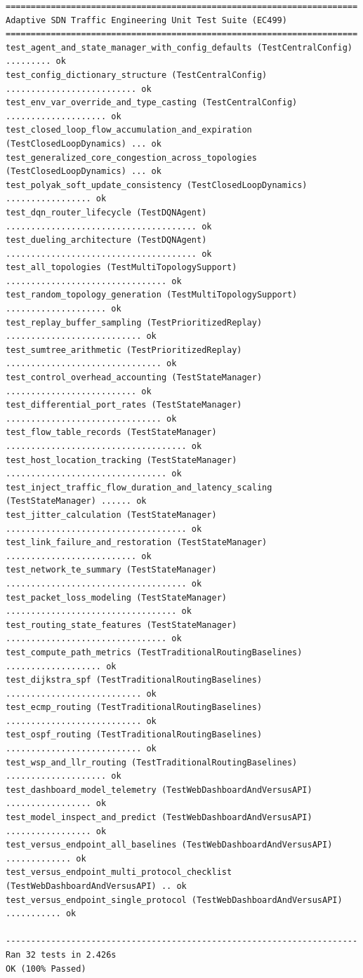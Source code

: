 \documentclass[12pt,a4paper,oneside]{report}
\begin{document}
\begin{lstlisting}[basicstyle=\ttfamily\scriptsize, caption={Full Execution Log of the Automated Test Suite (test\_suite.py)}]
======================================================================
Adaptive SDN Traffic Engineering Unit Test Suite (EC499)
======================================================================
test_agent_and_state_manager_with_config_defaults (TestCentralConfig) ......... ok
test_config_dictionary_structure (TestCentralConfig) .......................... ok
test_env_var_override_and_type_casting (TestCentralConfig) .................... ok
test_closed_loop_flow_accumulation_and_expiration (TestClosedLoopDynamics) ... ok
test_generalized_core_congestion_across_topologies (TestClosedLoopDynamics) ... ok
test_polyak_soft_update_consistency (TestClosedLoopDynamics) ................. ok
test_dqn_router_lifecycle (TestDQNAgent) ...................................... ok
test_dueling_architecture (TestDQNAgent) ...................................... ok
test_all_topologies (TestMultiTopologySupport) ................................ ok
test_random_topology_generation (TestMultiTopologySupport) .................... ok
test_replay_buffer_sampling (TestPrioritizedReplay) ........................... ok
test_sumtree_arithmetic (TestPrioritizedReplay) ............................... ok
test_control_overhead_accounting (TestStateManager) .......................... ok
test_differential_port_rates (TestStateManager) ............................... ok
test_flow_table_records (TestStateManager) .................................... ok
test_host_location_tracking (TestStateManager) ................................ ok
test_inject_traffic_flow_duration_and_latency_scaling (TestStateManager) ...... ok
test_jitter_calculation (TestStateManager) .................................... ok
test_link_failure_and_restoration (TestStateManager) .......................... ok
test_network_te_summary (TestStateManager) .................................... ok
test_packet_loss_modeling (TestStateManager) .................................. ok
test_routing_state_features (TestStateManager) ................................ ok
test_compute_path_metrics (TestTraditionalRoutingBaselines) ................... ok
test_dijkstra_spf (TestTraditionalRoutingBaselines) ........................... ok
test_ecmp_routing (TestTraditionalRoutingBaselines) ........................... ok
test_ospf_routing (TestTraditionalRoutingBaselines) ........................... ok
test_wsp_and_llr_routing (TestTraditionalRoutingBaselines) .................... ok
test_dashboard_model_telemetry (TestWebDashboardAndVersusAPI) ................. ok
test_model_inspect_and_predict (TestWebDashboardAndVersusAPI) ................. ok
test_versus_endpoint_all_baselines (TestWebDashboardAndVersusAPI) ............. ok
test_versus_endpoint_multi_protocol_checklist (TestWebDashboardAndVersusAPI) .. ok
test_versus_endpoint_single_protocol (TestWebDashboardAndVersusAPI) ........... ok

----------------------------------------------------------------------
Ran 32 tests in 2.426s
OK (100% Passed)
\end{lstlisting}
\end{document}
